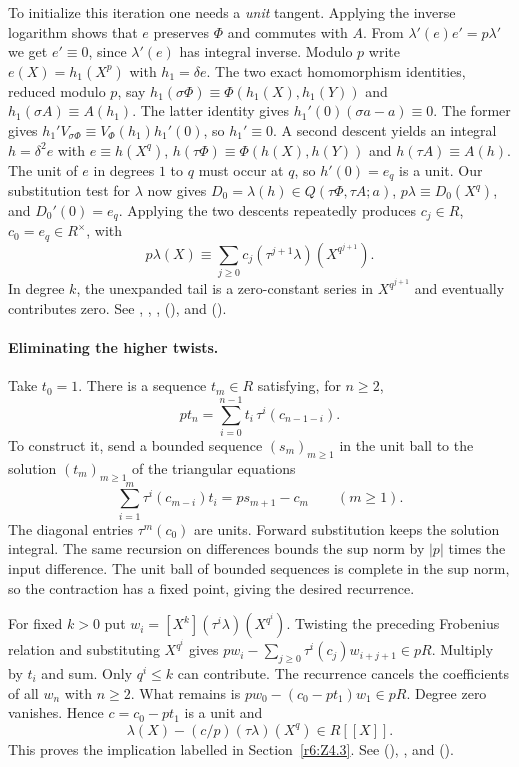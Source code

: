 To initialize this iteration one needs a \emph{unit} tangent.
Applying the inverse logarithm shows that $e$ preserves $\Phi$ and
commutes with $A$. From $\lambda'(e)e'=p\lambda'$ we get
$e'\equiv0$, since $\lambda'(e)$ has integral inverse. Modulo $p$
write $e(X)=h_1(X^p)$ with $h_1=\delta e$.
The two exact homomorphism identities, reduced modulo $p$, say
$h_1(\sigma\Phi)\equiv\Phi(h_1(X),h_1(Y))$ and
$h_1(\sigma A)\equiv A(h_1)$. The latter identity gives
$h_1'(0)(\sigma a-a)\equiv0$. The former gives
$h_1'V_{\sigma\Phi}\equiv V_\Phi(h_1)h_1'(0)$, so $h_1'\equiv0$.
A second descent yields an integral $h=\delta^2 e$ with
$e\equiv h(X^q)$, $h(\tau\Phi)\equiv\Phi(h(X),h(Y))$ and
$h(\tau A)\equiv A(h)$. The unit of $e$ in degrees $1$ to $q$
must occur at $q$, so $h'(0)=e_q$ is a unit.
Our substitution test for $\lambda$ now gives
$D_0=\lambda(h)\in Q(\tau\Phi,\tau A;a)$,
$p\lambda\equiv D_0(X^q)$, and $D_0'(0)=e_q$.
Applying the two descents repeatedly produces $c_j\in R$,
$c_0=e_q\in R^\times$, with
\[
 p\lambda(X)\equiv\sum_{j\ge0}c_j(\tau^{j+1}\lambda)(X^{q^{j+1}}).
\]
In degree $k$, the unexpanded tail is a zero-constant series
in $X^{q^{j+1}}$ and eventually contributes zero.
See , , ,
 (),
 and  ().

\paragraph{Eliminating the higher twists.}
Take $t_0=1$. There is a sequence $t_m\in R$ satisfying, for $n\ge2$,
\[
 p t_n=\sum_{i=0}^{n-1}t_i\,\tau^i(c_{n-1-i}).
\]
To construct it, send a bounded sequence $(s_m)_{m\ge1}$ in the unit
ball to the solution $(t_m)_{m\ge1}$ of the triangular equations
\[
 \sum_{i=1}^{m}\tau^i(c_{m-i})t_i=p s_{m+1}-c_m
 \qquad(m\ge1).
\]
The diagonal entries $\tau^m(c_0)$ are units. Forward substitution
keeps the solution integral. The same recursion on differences bounds
the sup norm by $|p|$ times the input difference. The unit ball of
bounded sequences is complete in the sup norm, so the contraction
has a fixed point, giving the desired recurrence.

For fixed $k>0$ put
$w_i=[X^k](\tau^i\lambda)(X^{q^i})$.
Twisting the preceding Frobenius relation and substituting $X^{q^i}$
gives $p w_i-\sum_{j\ge0}\tau^i(c_j) w_{i+j+1}\in pR$.
Multiply by $t_i$ and sum. Only $q^i\le k$ can contribute. The
recurrence cancels the coefficients of all $w_n$ with $n\ge2$.
What remains is $p w_0-(c_0-pt_1)w_1\in pR$.
Degree zero vanishes. Hence $c=c_0-pt_1$ is a unit and
\[
 \lambda(X)-(c/p)(\tau\lambda)(X^q)\in R[[X]].
\]
This proves the implication labelled  in
Section~\ref{r6:Z4.3}. See 
(), ,
 and  ().

